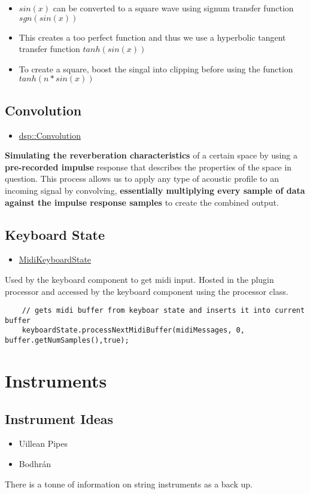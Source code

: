 \documentclass{article}
\begin{document}
	
	\begin{itemize}
		\item $sin(x)$ can be converted to a square wave using signum transfer function $sgn(sin(x))$
		\item This creates a too perfect function and thus we use a hyperbolic tangent transfer function $tanh(sin(x))$
		\item To create a square, boost the singal into clipping before using the function $tanh(n*sin(x))$
	\end{itemize}
	
	\subsection{Convolution}
	\begin{itemize}
		\item \href{https://docs.juce.com/master/classdsp_1_1Convolution.html}{dsp::Convolution}
	\end{itemize}
	\textbf{Simulating the reverberation characteristics} of a certain space by using a \textbf{pre-recorded impulse} response that describes the properties of the space in question. This process allows us to apply any type of acoustic profile to an incoming signal by convolving, \textbf{essentially multiplying every sample of data against the impulse response samples} to create the combined output.
	
	
	\subsection{Keyboard State}
	\begin{itemize}
		\item \href{https://docs.juce.com/develop/classMidiKeyboardState.html}{MidiKeyboardState}
	\end{itemize}
	Used by the keyboard component to get midi input. Hosted in the plugin processor and accessed by the keyboard component using the processor class.
	\begin{lstlisting}
	// gets midi buffer from keyboar state and inserts it into current buffer
	keyboardState.processNextMidiBuffer(midiMessages, 0, buffer.getNumSamples(),true);
	\end{lstlisting}

\section{Instruments}
	\subsection{Instrument Ideas}
	\begin{itemize}
		\item Uillean Pipes
		\item Bodhrán
	\end{itemize}
	There is a tonne of information on string instruments as a back up.
	
\end{document}
